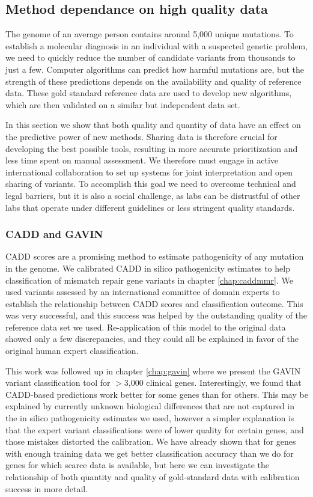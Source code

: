 \subsection{Method dependance on high quality data} \label{methodsection_data}

The genome of an average person contains around 5,000 unique mu\-ta\-tions\cite{Walter_2015}.
To establish a molecular diagnosis in an individual with a suspected genetic problem, we need to quickly reduce the number of candidate variants from thousands to just a few.
Computer algorithms can predict how harmful mutations are, but the strength of these predictions depends on the availability and quality of reference data.
These gold standard reference data are used to develop new algorithms, which are then validated on a similar but independent data set.

In this section we show that both quality and quantity of data have an effect on the predictive power of new methods.
Sharing data is therefore crucial for developing the best possible tools, resulting in more accurate prioritization and less time spent on manual assessment.
We therefore must engage in active international collaboration to set up systems for joint interpretation and open sharing of variants.
To accomplish this goal we need to overcome technical and legal barriers, but it is also a social challenge, as labs can be distrustful of other labs that operate under different guidelines or less stringent quality standards.

\subsubsection*{CADD and GAVIN}

CADD scores\cite{Kircher_2014} are a promising method to estimate pathogenicity of any mutation in the genome.
We calibrated CADD in silico pathogenicity estimates to help classification of mismatch repair gene variants in chapter \ref{chap:caddmmr}.
We used variants assessed by an international committee of domain experts to establish the relationship between CADD scores and classification outcome.
This was very successful, and this success was helped by the outstanding quality of the reference data set we used.
Re-application of this model to the original data showed only a few discrepancies, and they could all be explained in favor of the original human expert classification.

This work was followed up in chapter \ref{chap:gavin} where we present the GAVIN variant classification tool for $>$3,000 clinical genes.
Interestingly, we found that CADD-based predictions work better for some genes than for others.
This may be explained by currently unknown biological differences that are not captured in the in silico pathogenicity estimates we used, however a simpler explanation is that the expert variant classifications were of lower quality for certain genes, and those mistakes distorted the calibration. 
We have already shown that for genes with enough training data we get better classification accuracy than we do for genes for which scarce data is available, but here we can investigate the relationship of both quantity and quality of gold-standard data with calibration success in more detail.

